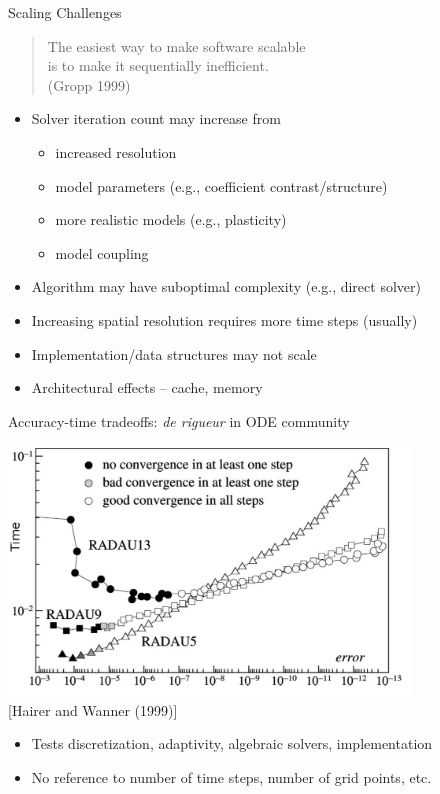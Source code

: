 \begin{frame}{Scaling Challenges}
  \begin{quote} \centering
    The easiest way to make software scalable \\
    is to make it sequentially inefficient. \\
    (Gropp 1999)
  \end{quote}
  \begin{itemize}
  \item Solver iteration count may increase from
    \begin{itemize}
    \item increased resolution
    \item model parameters (e.g., coefficient contrast/structure)
    \item more realistic models (e.g., plasticity)
    \item model coupling
    \end{itemize}
  \item Algorithm may have suboptimal complexity (e.g., direct solver)
  \item Increasing spatial resolution requires more time steps (usually)
  \item Implementation/data structures may not scale
  \item Architectural effects -- cache, memory
  \end{itemize}
\end{frame}

\begin{frame}{Accuracy-time tradeoffs: \emph{de rigueur} in ODE community}
  \begin{center}
    \includegraphics[width=0.8\textwidth]{figures/HairerWanner-WorkPrecision.png}\\
    {\scriptsize [Hairer and Wanner (1999)]}
  \end{center}
  \begin{itemize}
  \item Tests discretization, adaptivity, algebraic solvers, implementation
  \item No reference to number of time steps, number of grid points, etc.
  \end{itemize}
\end{frame}
